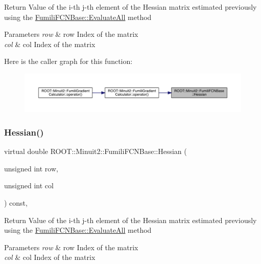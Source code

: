 Return Value of the i-\/th j-\/th element of the Hessian matrix estimated previously using the \mbox{\hyperlink{classROOT_1_1Minuit2_1_1FumiliFCNBase_a0741bb4a7405cc33ab60583472a189cb}{Fumili\+F\+C\+N\+Base\+::\+Evaluate\+All}} method 
\begin{DoxyParams}{Parameters}
{\em row} & row Index of the matrix \\
\hline
{\em col} & col Index of the matrix \\
\hline
\end{DoxyParams}
Here is the caller graph for this function\+:\nopagebreak
\begin{figure}[H]
\begin{center}
\leavevmode
\includegraphics[width=350pt]{de/dc5/classROOT_1_1Minuit2_1_1FumiliFCNBase_ade134d8c6613393e942ef98d445db376_icgraph}
\end{center}
\end{figure}
\mbox{\label{classROOT_1_1Minuit2_1_1FumiliFCNBase_ade134d8c6613393e942ef98d445db376}} 
\subsubsection{\texorpdfstring{Hessian()}{Hessian()}\hspace{0.1cm}{\footnotesize\ttfamily [2/4]}}
{\footnotesize\ttfamily virtual double R\+O\+O\+T\+::\+Minuit2\+::\+Fumili\+F\+C\+N\+Base\+::\+Hessian (\begin{DoxyParamCaption}\item[{unsigned int}]{row,  }\item[{unsigned int}]{col }\end{DoxyParamCaption}) const\hspace{0.3cm}{\ttfamily [inline]}, {\ttfamily [virtual]}}

Return Value of the i-\/th j-\/th element of the Hessian matrix estimated previously using the \mbox{\hyperlink{classROOT_1_1Minuit2_1_1FumiliFCNBase_a0741bb4a7405cc33ab60583472a189cb}{Fumili\+F\+C\+N\+Base\+::\+Evaluate\+All}} method 
\begin{DoxyParams}{Parameters}
{\em row} & row Index of the matrix \\
\hline
{\em col} & col Index of the matrix \\
\hline
\end{DoxyParams}
\mbox{\label{classROOT_1_1Minuit2_1_1FumiliFCNBase_ac90c52050c1f7557834e3fa82c2657f3}} 
